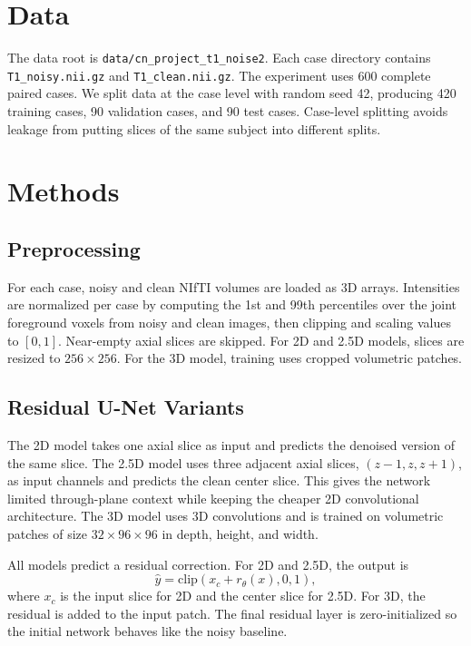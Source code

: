 \documentclass{article}
\begin{document}
\section{Data}

The data root is \texttt{data/cn\_project\_t1\_noise2}. Each case directory contains \texttt{T1\_noisy.nii.gz} and \texttt{T1\_clean.nii.gz}. The experiment uses 600 complete paired cases. We split data at the case level with random seed 42, producing 420 training cases, 90 validation cases, and 90 test cases. Case-level splitting avoids leakage from putting slices of the same subject into different splits.

\section{Methods}

\subsection{Preprocessing}

For each case, noisy and clean NIfTI volumes are loaded as 3D arrays. Intensities are normalized per case by computing the 1st and 99th percentiles over the joint foreground voxels from noisy and clean images, then clipping and scaling values to $[0,1]$. Near-empty axial slices are skipped. For 2D and 2.5D models, slices are resized to $256\times256$. For the 3D model, training uses cropped volumetric patches.

\subsection{Residual U-Net Variants}

The 2D model takes one axial slice as input and predicts the denoised version of the same slice. The 2.5D model uses three adjacent axial slices, $(z-1,z,z+1)$, as input channels and predicts the clean center slice. This gives the network limited through-plane context while keeping the cheaper 2D convolutional architecture. The 3D model uses 3D convolutions and is trained on volumetric patches of size $32\times96\times96$ in depth, height, and width.

All models predict a residual correction. For 2D and 2.5D, the output is
\begin{equation}
  \hat{y} = \mathrm{clip}(x_c + r_\theta(x), 0, 1),
\end{equation}
where $x_c$ is the input slice for 2D and the center slice for 2.5D. For 3D, the residual is added to the input patch. The final residual layer is zero-initialized so the initial network behaves like the noisy baseline.
\end{document}
